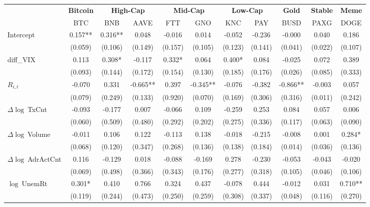 \begin{table}[ht]
\centering
\scriptsize
\setlength{\tabcolsep}{4pt}
\begin{tabular}{l *{10}{c}}
\toprule
&\multicolumn{1}{c}{\textbf{Bitcoin}}&\multicolumn{2}{c}{\textbf{High-Cap}}&\multicolumn{2}{c}{\textbf{Mid-Cap}}&\multicolumn{2}{c}{\textbf{Low-Cap}}&\multicolumn{1}{c}{\textbf{Gold}}&\multicolumn{1}{c}{\textbf{Stable}}&\multicolumn{1}{c}{\textbf{Meme}}\\
\addlinespace
 & BTC & BNB & AAVE & FTT & GNO & KNC & PAY & BUSD & PAXG & DOGE \\
\midrule
Intercept & 0.157** & 0.316** & 0.048 & -0.016 & 0.014 & -0.052 & -0.236 & -0.000 & 0.040 & 0.186 \\
 & (0.059) & (0.106) & (0.149) & (0.157) & (0.105) & (0.123) & (0.141) & (0.041) & (0.022) & (0.107) \\
\addlinespace
diff_VIX & 0.113 & 0.308* & -0.117 & 0.332* & 0.064 & 0.400* & 0.084 & -0.025 & 0.072 & 0.389 \\
 & (0.093) & (0.144) & (0.172) & (0.154) & (0.130) & (0.185) & (0.176) & (0.026) & (0.085) & (0.333) \\
\addlinespace
$R_{i,t}$ & -0.070 & 0.331 & -0.665** & 0.397 & -0.345** & -0.076 & -0.382 & -0.866** & -0.003 & 0.057 \\
 & (0.079) & (0.249) & (0.133) & (0.920) & (0.070) & (0.169) & (0.306) & (0.316) & (0.011) & (0.242) \\
\addlinespace
$\Delta\log\ $TxCnt & -0.093 & -0.177 & 0.007 & -0.066 & 0.109 & -0.259 & 0.253 & 0.084 & 0.057 & 0.006 \\
 & (0.060) & (0.509) & (0.480) & (0.292) & (0.202) & (0.275) & (0.336) & (0.117) & (0.063) & (0.090) \\
\addlinespace
$\Delta\log\ $Volume & -0.011 & 0.106 & 0.122 & -0.113 & 0.138 & -0.018 & -0.215 & -0.008 & 0.001 & 0.284* \\
 & (0.068) & (0.120) & (0.347) & (0.268) & (0.136) & (0.138) & (0.184) & (0.014) & (0.036) & (0.136) \\
\addlinespace
$\Delta\log\ $AdrActCnt & 0.116 & -0.129 & 0.018 & -0.088 & -0.169 & 0.278 & -0.230 & -0.053 & -0.043 & -0.020 \\
 & (0.069) & (0.498) & (0.366) & (0.343) & (0.176) & (0.277) & (0.318) & (0.105) & (0.046) & (0.106) \\
\addlinespace
$\log\ $UnemRt & 0.301* & 0.410 & 0.766 & 0.324 & 0.437 & -0.078 & 0.444 & -0.012 & 0.031 & 0.710** \\
 & (0.119) & (0.244) & (0.473) & (0.250) & (0.259) & (0.308) & (0.337) & (0.048) & (0.116) & (0.270) \\

\end{tabular}
\end{table}
